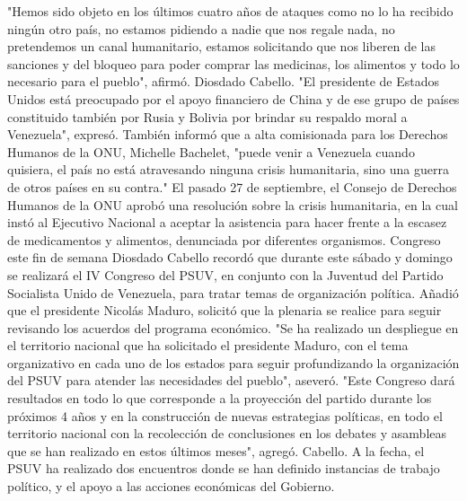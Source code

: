 \documentclass{article}%
\begin{document}
\newline%
%
"Hemos sido objeto en los últimos cuatro años de ataques como no lo ha recibido ningún otro país, no estamos pidiendo a nadie que nos regale nada, no pretendemos un canal humanitario, estamos solicitando que nos liberen de las sanciones y del bloqueo para poder comprar las medicinas, los alimentos y todo lo necesario para el  pueblo", afirmó. Diosdado Cabello.%
\newline%
%
"El presidente de Estados Unidos está preocupado por el apoyo financiero de China y de ese grupo de países constituido también por Rusia y Bolivia por brindar su respaldo moral a Venezuela", expresó.%
\newline%
%
También informó que a alta comisionada para los Derechos Humanos de la ONU, Michelle Bachelet, "puede venir a Venezuela cuando quisiera, el país no está atravesando ninguna crisis humanitaria, sino una guerra de otros países en su contra."%
\newline%
%
El pasado 27 de septiembre, el Consejo de Derechos Humanos de la ONU aprobó una resolución sobre la crisis humanitaria, en la cual instó al Ejecutivo Nacional  a aceptar la asistencia para hacer frente a la escasez de medicamentos y alimentos, denunciada por diferentes organismos.%
\newline%
%
Congreso este fin de semana%
\newline%
%
Diosdado Cabello recordó que durante este sábado y domingo se  realizará el IV Congreso del PSUV,  en conjunto con la Juventud del Partido Socialista Unido de Venezuela, para tratar temas de organización política.%
\newline%
%
Añadió que el presidente Nicolás Maduro, solicitó que la plenaria se realice para seguir revisando los acuerdos del programa económico.\newline%
"Se ha realizado un despliegue en el territorio nacional que ha solicitado el presidente Maduro, con el tema organizativo en cada uno de los estados para seguir profundizando la organización del PSUV para atender las necesidades del pueblo", aseveró.%
\newline%
%
"Este Congreso dará resultados en todo lo que corresponde a la proyección del partido durante los próximos 4 años y en la construcción de nuevas estrategias políticas, en todo el territorio nacional con la recolección de conclusiones en los debates y asambleas que se han realizado en estos últimos meses", agregó. Cabello.%
\newline%
%
A la fecha, el PSUV ha realizado dos encuentros donde se han definido instancias de trabajo político, y el apoyo a las acciones económicas del Gobierno.%
\newline%
%
\end{document}
